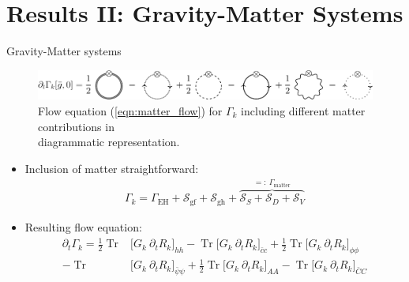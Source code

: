 \documentclass{beamer}
\begin{document}
\section{Results II: Gravity-Matter Systems}

\begin{frame}{Gravity-Matter systems}
\begin{figure}
	\centering
	\includegraphics[width=\textwidth]{figures/matter_corrections}
	\caption{Flow equation (\ref{eqn:matter_flow}) for $\Gamma_k$ including different matter contributions in \\
	\hspace{1.4cm} diagrammatic representation.}
	\vspace{-0.2cm}
	\hrulefill
\end{figure}
\begin{itemize}
	\item Inclusion of matter straightforward:
	\vspace{-0.2cm}
	\begin{align}
		\Gamma_k = \Gamma_{\text{EH}} + \mathcal{S}_{\text{gf}} + \mathcal{S}_{\text{gh}} + \overbrace{\mathcal{S}_{S} + \mathcal{S}_{D} + \mathcal{S}_{V}}^{=: \ \Gamma_{\text{matter}}}
	\end{align}
	\item Resulting flow equation:
	\begin{equation}
\begin{aligned}
 \partial_t\Gamma_{k} =\frac{1}{2} \operatorname{Tr}&\bigl[G_k\ \partial_t R_{k}\bigr]_{h h} - \operatorname{Tr}\bigl[G_k\ \partial_t R_{k}\bigr]_{\bar{c}c} + \frac{1}{2}\operatorname{Tr}\bigl[G_k\ \partial_t R_{k}\bigr]_{\phi\phi}\\[10pt] -\operatorname{Tr}&\bigl[G_k\ \partial_t R_{k}\bigr]_{\bar{\psi} \psi} 
 +\frac{1}{2}\operatorname{Tr}\bigl[G_k\ \partial_t R_{k}\bigr]_{AA} -\operatorname{Tr}\bigl[G_k\ \partial_t R_{k}\bigr]_{\bar{C}C}\end{aligned}
\label{eqn:matter_flow}
\end{equation}
\end{itemize}
\end{frame}
\end{document}
